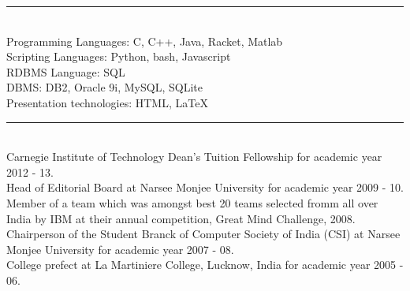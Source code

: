 \documentclass[a4paper,oneside,english]{article}
\begin{document}
\noindent\rule{6in}{0.4pt} \\[4pt]
Programming Languages: C, C++, Java, Racket, Matlab \vspace*{2mm}  \\
Scripting Languages: Python, bash, Javascript \vspace*{2mm} \\ 
RDBMS Language: SQL \vspace*{2mm} \\  
DBMS: DB2, Oracle 9i, MySQL, SQLite \vspace*{2mm} \\ 
Presentation technologies: HTML, \LaTeX \\
\clearpage
\noindent\rule{6in}{0.4pt} \\[4pt]
Carnegie Institute of Technology Dean's Tuition Fellowship for academic year 2012 - 13. \vspace*{2mm} \\
Head of Editorial Board at Narsee Monjee University for academic year 2009 - 10. \vspace*{2mm} \\
\noindent Member of a team which was amongst best 20 teams selected fromm all over India by IBM at their annual competition, Great Mind Challenge, 2008. \vspace*{2mm} \\
Chairperson of the Student Branck of Computer Society of India (CSI) at Narsee Monjee University for academic year 2007 - 08.  \vspace*{2mm} \\
College prefect at La Martiniere College, Lucknow, India for academic year 2005 - 06.
\end{document}
